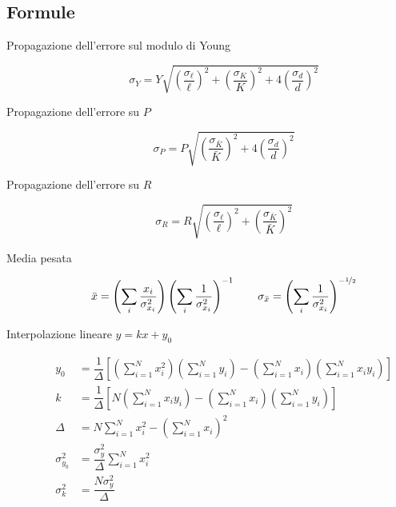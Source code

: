\documentclass[italian,a4paper]{article}
\begin{document}
\subsection*{Formule}
\begin{description}
 \item[Propagazione dell'errore sul modulo di Young]
\begin{equation*}
 \sigma_Y = Y\sqrt{\left(\dfrac{\sigma_\ell}{\ell}\right)^2 + \left(\dfrac{\sigma_K}{K}\right)^2 + 4\left(\dfrac{\sigma_d}{d}\right)^2}
\end{equation*}
 \item[Propagazione dell'errore su $P$]
\begin{equation*}
 \sigma_P = P\sqrt{\left(\dfrac{\sigma_{\bar{K}}}{\bar{K}}\right)^2 + 4\left(\dfrac{\sigma_d}{d}\right)^2}
\end{equation*}
 \item[Propagazione dell'errore su $R$]
\begin{equation*}
 \sigma_R = R\sqrt{\left(\dfrac{\sigma_\ell}{\ell}\right)^2 + \left(\dfrac{\sigma_{\bar{K}}}{\bar{K}}\right)^2}
\end{equation*}
 \item[Media pesata]
\begin{equation*}
 \bar{x}=\left(\sum_i \dfrac{x_i}{\sigma_{x_i}^2} \right)\left(\sum_i \dfrac{1}{\sigma_{x_i}^2} \right)^{-1} \qquad \sigma_{\bar{x}} = \left(\sum_i \dfrac{1}{\sigma_{x_i}^2} \right)^{-\nicefrac 1 2}
\end{equation*}
\item[Interpolazione lineare $y=kx+y_0$]
\begin{align*}
y_0 &= \dfrac{1}{\Delta}\left[ \left(\sum_{i=1}^Nx_i^2\right) \left(\sum_{i=1}^Ny_i\right)-\left(\sum_{i=1}^Nx_i\right)\left(\sum_{i=1}^Nx_iy_i\right)\right]\\[3pt]
k &= \dfrac{1}{\Delta}\left[N \left(\sum_{i=1}^Nx_iy_i\right)-\left(\sum_{i=1}^Nx_i\right)\left(\sum_{i=1}^Ny_i\right)\right]\\[3pt]
\Delta &= N\sum_{i=1}^Nx_i^2 - \left(\sum_{i=1}^Nx_i\right)^2\\[6pt]
\sigma_{y_0}^2 &= \dfrac{\sigma_y^2}{\Delta}\sum_{i=1}^Nx_i^2\\[3pt]
\sigma_k^2 &= \dfrac{N\sigma_y^2}{\Delta}
\end{align*}

\end{description}
\end{document}
